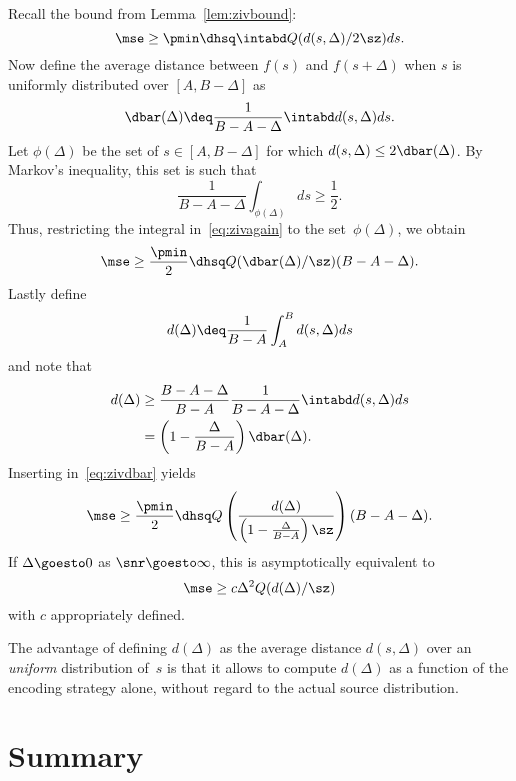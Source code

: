 Recall the bound from Lemma~\ref{lem:zivbound}:
\begin{equation}
  \label{eq:zivagain}
  \mse \ge \pmin \dhsq \intabd Q(d(s,\Delta) / 2 \sz) ds.
\end{equation}
Now define the average distance between $f(s)$ and $f(s+\Delta)$ when $s$ is
uniformly distributed over $[A, B-\Delta]$ as
\begin{equation*}
  \dbar(\Delta) \deq \frac{1}{B-A-\Delta} \intabd d(s, \Delta) ds.
\end{equation*}
Let $\phi(\Delta)$ be the set of $s \in [A, B-\Delta]$ for which $d(s, \Delta)
\le 2 \dbar(\Delta)$. By Markov's inequality, this set is such that
\begin{equation*}
  \frac{1}{B-A-\Delta} \int_{\phi(\Delta)} ds \ge \frac{1}{2}.
\end{equation*}
Thus, restricting the integral in~\eqref{eq:zivagain} to the set~$\phi(\Delta)$,
we obtain
\begin{equation}
  \label{eq:zivdbar}
  \mse \ge \frac{\pmin}{2} \dhsq Q(\dbar(\Delta)/\sz) (B-A-\Delta).
\end{equation}
Lastly define
\begin{equation*}
  d(\Delta) \deq \frac{1}{B-A} \int_A^B d(s,\Delta) ds
\end{equation*}
and note that
\begin{align*}
  d(\Delta) &\ge \frac{B-A-\Delta}{B-A} \frac{1}{B-A-\Delta} \intabd d(s,
  \Delta) ds \\
  &= \left(1 - \frac{\Delta}{B-A}\right) \dbar(\Delta).
\end{align*}
Inserting in~\eqref{eq:zivdbar} yields
\begin{equation*}
  \mse \ge \frac{\pmin}{2} \dhsq Q\left(\frac{d(\Delta)}{\left(1 -
  \frac{\Delta}{B-A}\right) \sz} \right) (B-A-\Delta).
\end{equation*}
If $\Delta \goesto 0$ as $\snr \goesto \infty$, this
is asymptotically equivalent to
\begin{equation*}
  \mse \ge c \Delta^2 Q(d(\Delta)/\sz)
\end{equation*}
with $c$ appropriately defined.

The advantage of defining $d(\Delta)$ as the average distance $d(s,\Delta)$ over
an \emph{uniform} distribution of~$s$ is that it allows to compute $d(\Delta)$
as a function of the encoding strategy alone, without regard to the actual
source distribution.

\section{Summary}

